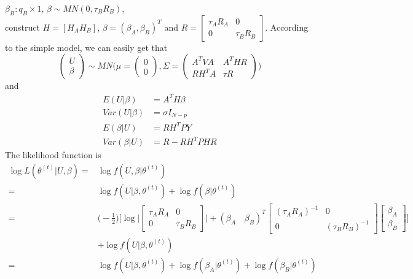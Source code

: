\documentclass[12pt]{article}
\begin{document}
    $\beta_B:q_B\times 1$, $\beta\sim MN(0,\tau_B R_B)$, \\
    construct $H=[H_A H_B]$, $\beta=(\beta_A, \beta_B)^T$ and $R=\begin{bmatrix}\tau_A R_A&0\\0&\tau_B R_B \end{bmatrix} $.
    According to the simple model, we can easily get that
    \begin{equation*}
    \begin{pmatrix}
    U\\
    \beta
    \end{pmatrix}
    \sim MN\Big( \mu=\begin{pmatrix}
    0\\
    0
    \end{pmatrix}
    ,\Sigma=\begin{pmatrix}
    A^TVA& A^THR\\
    RH^TA&\tau R
    \end{pmatrix}
    \Big)
    \end{equation*}
    and
    \begin{align*}
        E(U|\beta)&=A^TH\beta\\
        Var(U|\beta)&=\sigma I_{N-p}\\
        E(\beta|U)&=RH^TPY\\
        Var(\beta|U)&= R-RH^TPHR
    \end{align*}
    The likelihood function is
    \begin{align*}
        \log L(\theta^{(t)}|U,\beta)=&\log f(U,\beta|\theta^{(t)})\\
        =&\log f(U|\beta,\theta^{(t)})+ \log f(\beta|\theta^{(t)})\\
        =&\Big(-\frac{1}{2} \Big)\Big[\log\Big|\begin{bmatrix} \tau_AR_A&0\\0&\tau_BR_B \end{bmatrix} \Big|+(\beta_A\quad\beta_B)^T
        \begin{bmatrix}(\tau_AR_A)^{-1}&0\\0&(\tau_BR_B)^{-1}\end{bmatrix}\begin{bmatrix}\beta_A\\ \beta_B\end{bmatrix}           \Big]\\
        &+\log f(U|\beta,\theta^{(t)})\\
        =&\log f(U|\beta,\theta^{(t)})+ \log f(\beta_A|\theta^{(t)})+ \log f(\beta_B|\theta^{(t)})\\
    \end{align*}
\end{document}
